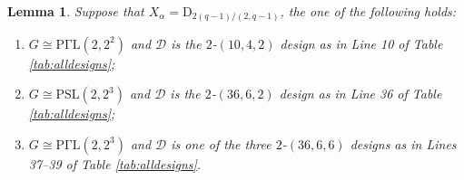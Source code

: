 \documentclass[a4paper,twopage,reqno,12pt]{amsart}
\newtheorem{lemma}[theorem]{Lemma}
\theoremstyle{definition}
\numberwithin{equation}{section}
\newcommand{\PSL}{\mathrm{PSL}}
\newcommand{\PGaL}{\mathrm{P\Gamma L}}
\newcommand{\PSigL}{\mathrm{P\Sigma L}}
\newcommand{\A}{\mathrm{A}}
\renewcommand{\S}{\mathrm{S}}
\begin{document}
    
\begin{lemma}\label{case7}
Suppose that $X_{\alpha}=\mathrm{D}_{2(q-1)/(2,q-1)}$, 
the one of the following holds:
\begin{enumerate}
\item $G\cong \PGaL(2,2^2)$ and $\mathcal{D}$ is the $2$-$(10,4,2)$ design as in Line 10 of Table \ref{tab:alldesigns};
\item $G\cong\PSL(2,2^3)$ and $\mathcal{D}$ is the $2$-$(36,6,2)$ design as in Line 36 of Table \ref{tab:alldesigns};
\item $G\cong \PGaL(2,2^3)$ and $\mathcal{D}$ is one of the three $2$-$(36,6,6)$ designs as in Lines 37--39 of Table \ref{tab:alldesigns}.
\end{enumerate}
\end{lemma}
\end{document}
